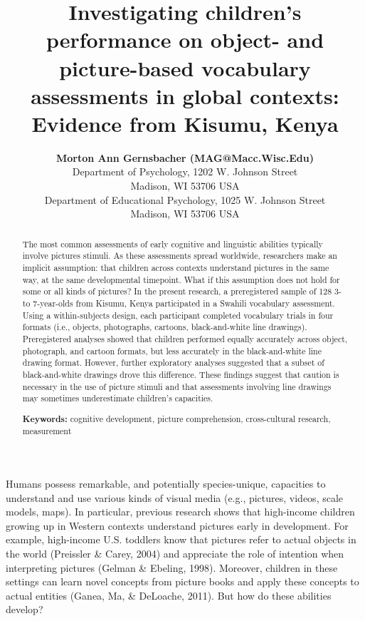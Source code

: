 \documentclass[10pt, letterpaper]{article}
\title{Investigating children's performance on object- and picture-based
vocabulary assessments in global contexts: Evidence from Kisumu, Kenya}
\author{{\large \bf Morton Ann Gernsbacher (MAG@Macc.Wisc.Edu)} \\ Department of Psychology, 1202 W. Johnson Street \\ Madison, WI 53706 USA
  \AND {\large \bf Sharon J.~Derry (SDJ@Macc.Wisc.Edu)} \\ Department of Educational Psychology, 1025 W. Johnson Street \\ Madison, WI 53706 USA}
\begin{document}
\maketitle

\begin{abstract}
The most common assessments of early cognitive and linguistic abilities
typically involve pictures stimuli. As these assessments spread
worldwide, researchers make an implicit assumption: that children across
contexts understand pictures in the same way, at the same developmental
timepoint. What if this assumption does not hold for some or all kinds
of pictures? In the present research, a preregistered sample of 128 3-
to 7-year-olds from Kisumu, Kenya participated in a Swahili vocabulary
assessment. Using a within-subjects design, each participant completed
vocabulary trials in four formats (i.e., objects, photographs, cartoons,
black-and-white line drawings). Preregistered analyses showed that
children performed equally accurately across object, photograph, and
cartoon formats, but less accurately in the black-and-white line drawing
format. However, further exploratory analyses suggested that a subset of
black-and-white drawings drove this difference. These findings suggest
that caution is necessary in the use of picture stimuli and that
assessments involving line drawings may sometimes underestimate
children's capacities.

\textbf{Keywords:}
cognitive development, picture comprehension, cross-cultural research,
measurement
\end{abstract}

Humans possess remarkable, and potentially species-unique, capacities to
understand and use various kinds of visual media (e.g., pictures,
videos, scale models, maps). In particular, previous research shows that
high-income children growing up in Western contexts understand pictures
early in development. For example, high-income U.S. toddlers know that
pictures refer to actual objects in the world (Preissler \& Carey, 2004)
and appreciate the role of intention when interpreting pictures (Gelman
\& Ebeling, 1998). Moreover, children in these settings can learn novel
concepts from picture books and apply these concepts to actual entities
(Ganea, Ma, \& DeLoache, 2011). But how do these abilities develop?
\end{document}
